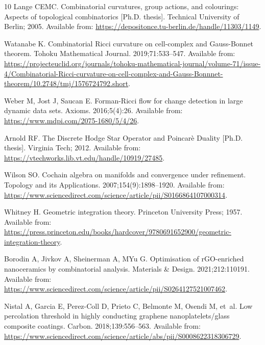 \documentclass{elsarticle}
\theoremstyle{definition}
\begin{document}
\begin{thebibliography}{10}
Lange CEMC.
\newblock Combinatorial curvatures, group actions, and colourings: Aspects of
  topological combinatorics [Ph.D. thesis].
\newblock Technical University of Berlin; 2005.
\newblock Available from:
  \url{https://depositonce.tu-berlin.de/handle/11303/1149}.

Watanabe K.
\newblock Combinatorial Ricci curvature on cell-complex and Gauss-Bonnet
  theorem.
\newblock Tohoku Mathematical Journal. 2019;71:533--547.
\newblock Available from:
  \url{https://projecteuclid.org/journals/tohoku-mathematical-journal/volume-71/issue-4/Combinatorial-Ricci-curvature-on-cell-complex-and-Gauss-Bonnnet-theorem/10.2748/tmj/1576724792.short}.

Weber M, Jost J, Saucan E.
\newblock Forman-Ricci flow for change detection in large dynamic data sets.
\newblock Axioms. 2016;5(4):26.
\newblock Available from: \url{https://www.mdpi.com/2075-1680/5/4/26}.

Arnold RF.
\newblock The Discrete Hodge Star Operator and Poincar\`e Duality [Ph.D.
  thesis].
\newblock Virginia Tech; 2012.
\newblock Available from:
  \url{https://vtechworks.lib.vt.edu/handle/10919/27485}.

Wilson SO.
\newblock Cochain algebra on manifolds and convergence under refinement.
\newblock Topology and its Applications. 2007;154(9):1898--1920.
\newblock Available from:
  \url{https://www.sciencedirect.com/science/article/pii/S0166864107000314}.

Whitney H.
\newblock Geometric integration theory.
\newblock Princeton University Press; 1957.
\newblock Available from:
  \url{https://press.princeton.edu/books/hardcover/9780691652900/geometric-integration-theory}.

Borodin A, Jivkov A, Sheinerman A, MYu G.
\newblock Optimisation of rGO-enriched nanoceramics by combinatorial analysis.
\newblock Materials \& Design. 2021;212:110191.
\newblock Available from:
  \url{https://www.sciencedirect.com/science/article/pii/S0264127521007462}.

Nistal A, Garcia E, Perez-Coll D, Prieto C, Belmonte M, Osendi M, et~al.
\newblock Low percolation threshold in highly conducting graphene
  nanoplatelets/glass composite coatings.
\newblock Carbon. 2018;139:556–563.
\newblock Available from:
  \url{https://www.sciencedirect.com/science/article/abs/pii/S0008622318306729}.


\end{thebibliography}
\end{document}
